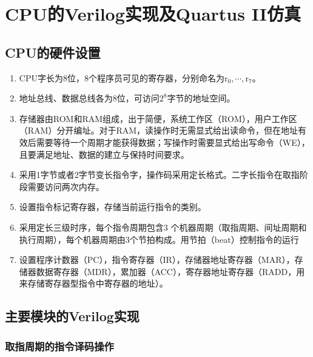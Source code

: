 \chapter{CPU的Verilog实现及Quartus II仿真}

\section{CPU的硬件设置}

\begin{enumerate}
\item CPU字长为8位，8个程序员可见的寄存器，分别命名为$\mathrm{r_0,\cdots,r_7}$。
\item 地址总线、数据总线各为8位，可访问$2^8$字节的地址空间。
\item 存储器由ROM和RAM组成，出于简便，系统工作区（ROM），用户工作区（RAM）分开编址。对于RAM，读操作时无需显式给出读命令，但在地址有效后需要等待一个周期才能获得数据；写操作时需要显式给出写命令（WE），且要满足地址、数据的建立与保持时间要求。
\item 采用1字节或者2字节变长指令字，操作码采用定长格式。二字长指令在取指阶段需要访问两次内存。
\item 设置指令标记寄存器，存储当前运行指令的类别。
\item 采用定长三级时序，每个指令周期包含3 个机器周期（取指周期、间址周期和执行周期），每个机器周期由3个节拍构成。用节拍（beat）控制指令的运行
\item 设置程序计数器（PC），指令寄存器（IR），存储器地址寄存器（MAR），存储器数据寄存器（MDR），累加器（ACC），寄存器地址寄存器（RADD，用来存储寄存器型指令中寄存器的地址）。
\end{enumerate}

\section{主要模块的Verilog实现}

\subsection{取指周期的指令译码操作}

